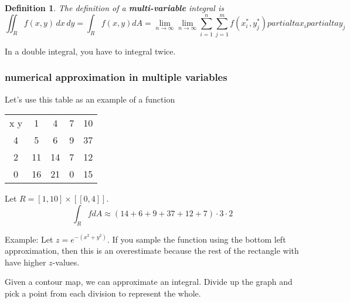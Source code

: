 \documentclass[11pt]{article}
\newtheorem{defn}{Definition}
\begin{document}
\begin{defn}
  The definition of a \textbf{multi-variable} integral is
  \[\iint_R f(x,y) \,dx \,dy = \int_R f(x,y) dA = \lim_{n\to \infty} \lim_{n \to \infty} \sum_{i=1}^n \sum_{j=1}^m f(x_i^*, y_j^*) partialta x_i partialta y_j\]
\end{defn}
In a double integral, you have to integral twice.
\subsubsection{numerical approximation in multiple variables}
Let's use this table as an example of a function

\begin{table}
  \centering
  \begin{tabular}{c c c c c}
    x y &1 &4& 7 &10\\
    4 & 5 & 6 & 9 & 37 \\
    2 & 11 & 14 & 7 & 12 \\
    0 & 16 & 21 & 0 & 15
  \end{tabular}
\end{table}
Let $R = [1,10] \times [[0,4]]$.
\[\int_R f dA \approx (14 + 6 + 9 + 37 + 12 + 7)\cdot3\cdot 2\]

Example: Let $z = e^{-(x^2+y^2)}$. If you sample the function using the bottom left approximation,
then this is an overestimate because the rest of the rectangle with have higher $z$-values.

Given a contour map, we can approximate an integral. Divide up the graph and pick a point
from each division to represent the whole.
\end{document}
